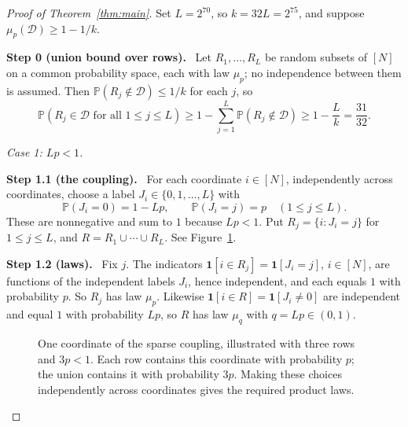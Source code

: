 \documentclass[11pt,letterpaper]{article}
\theoremstyle{definition}
\theoremstyle{remark}
\numberwithin{equation}{section}
\newcommand{\step}[1]{\par\medskip\noindent\textbf{#1}\ }
\begin{document}
\begin{proof}[Proof of Theorem~\ref{thm:main}]
Set $L=2^{70}$, so $k=32L=2^{75}$, and suppose
$\mu_p(\mathcal D)\ge1-1/k$.

\step{Step 0 (union bound over rows).}
Let $R_1,\ldots,R_L$ be random subsets of $[N]$ on a common probability
space, each with law $\mu_p$; no independence between them is assumed.
Then $\mathbb P(R_j\notin\mathcal D)\le1/k$ for each $j$, so
\begin{equation}
\label{eq:all-good-rows}
\mathbb P(R_j\in\mathcal D\text{ for all }1\le j\le L)
\ge1-\sum_{j=1}^L\mathbb P(R_j\notin\mathcal D)
\ge1-\frac Lk=\frac{31}{32}.
\end{equation}

\medskip
\noindent\emph{Case 1: $Lp<1$.}

\step{Step 1.1 (the coupling).}
For each coordinate $i\in[N]$, independently across coordinates, choose a
label $J_i\in\{0,1,\ldots,L\}$ with
\[
\mathbb P(J_i=0)=1-Lp,
\qquad
\mathbb P(J_i=j)=p\quad(1\le j\le L).
\]
These are nonnegative and sum to $1$ because $Lp<1$. Put
$R_j=\{i:J_i=j\}$ for $1\le j\le L$, and $R=R_1\cup\cdots\cup R_L$. See
Figure~\ref{fig:coupling}.

\step{Step 1.2 (laws).}
Fix $j$. The indicators $\mathbf 1[i\in R_j]=\mathbf 1[J_i=j]$,
$i\in[N]$, are functions of the independent labels $J_i$, hence
independent, and each equals $1$ with probability $p$. So $R_j$ has law
$\mu_p$. Likewise $\mathbf 1[i\in R]=\mathbf 1[J_i\ne0]$ are independent
and equal $1$ with probability $Lp$, so $R$ has law $\mu_q$ with
$q=Lp\in(0,1)$.

\begin{figure}[!ht]
\centering
{}
\caption{One coordinate of the sparse coupling, illustrated with three
rows and $3p<1$. Each row contains this coordinate with probability $p$;
the union contains it with probability $3p$. Making these choices
independently across coordinates gives the required product laws.}
\label{fig:coupling}
\end{figure}


\end{proof}
\end{document}
